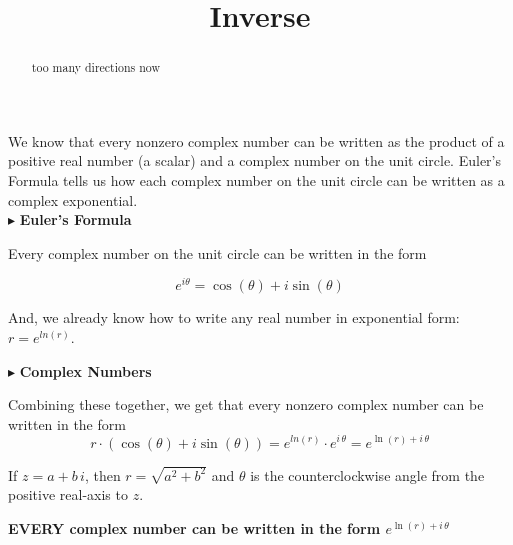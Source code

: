 \documentclass{ximera}
\title{Inverse}
\begin{document}
\begin{abstract}
too many directions now
\end{abstract}
\maketitle





We know that every nonzero complex number can be written as the product of a positive real number (a scalar) and a complex number on the unit circle.  Euler's Formula tells us how each complex number on the unit circle can be written as a complex exponential. \\




$\blacktriangleright$ \textbf{\textcolor{purple!85!blue}{Euler's Formula}}   


Every complex number on the unit circle can be written in the form


\[   e^{i \theta} = \cos(\theta) + i \sin(\theta)         \]


And, we already know how to write any real number in exponential form: $r = e^{ln(r)}$.  





$\blacktriangleright$ \textbf{\textcolor{purple!85!blue}{Complex Numbers}}   




Combining these together, we get that every nonzero complex number can be written in the form  
\[
r \cdot (\cos(\theta) + i \sin(\theta))  = e^{ln(r)} \cdot e^{i \, \theta} = e^{\ln(r) + i \, \theta}
\]



If $z = a + b \, i$, then $r = \sqrt{a^2 + b^2}$ and $\theta$ is the counterclockwise angle from the positive real-axis to $z$.




\begin{center}

\textbf{\textcolor{red!80!black}{EVERY complex number can be written in the form $e^{\ln(r) + i \, \theta}$}}

\end{center}
\end{document}
